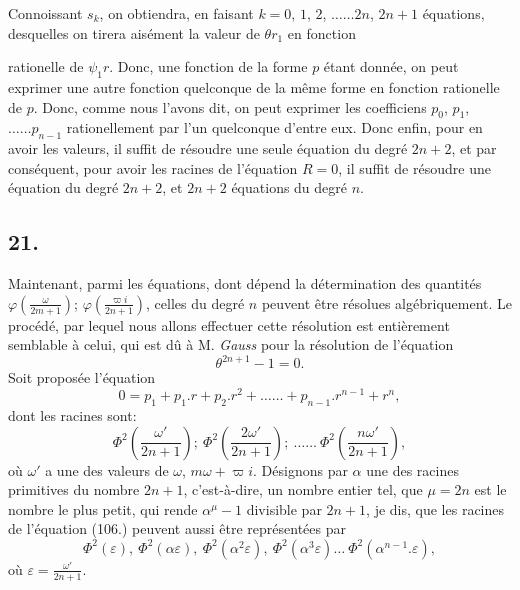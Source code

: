 \documentclass{article}
\begin{document}
Connoissant $s_{k}$, on obtiendra, en faisant $k=0$, $1$, $2$, $\ldots\ldots 2n$, $2n+1$ équations, desquelles on tirera aisément la valeur de $\theta r_{1}$ en fonction

rationelle de $\psi_{1}r$. Donc, une fonction de la forme $p$ étant donnée, on peut exprimer une autre fonction quelconque de la même forme en fonction rationelle de $p$. Donc, comme nous l'avons dit, on peut exprimer les coefficiens $p_{0}$, $p_{1}$, $\ldots\ldots p_{n-1}$ rationellement par l'un quelconque d'entre eux. Donc enfin, pour en avoir les valeurs, il suffit de résoudre une seule équation du degré $2n+2$, et par conséquent, pour avoir les racines de l'équation $R=0$, il suffit de résoudre une équation du degré $2n+2$, et $2n+2$ équations du degré $n$.

\subsection*{21.}

Maintenant, parmi les équations, dont dépend la détermination des quantités $\varphi\left(\frac{\omega}{2m+1}\right)$; $\varphi\left(\frac{\varpi i}{2n+1}\right)$, celles du degré $n$ peuvent être résolues algébriquement. Le procédé, par lequel nous allons effectuer cette résolution est entièrement semblable à celui, qui est dû à M. \emph{Gauss} pour la résolution de l'équation
\[ \theta^{2n+1}-1=0. \]
Soit proposée l'équation
\[ 0=p_{1}+p_{1}.r+p_{2}.r^{2}+\ldots\ldots+p_{n-1}.r^{n-1}+r^{n}, \tag{106.} \]
dont les racines sont:
\[ \Phi^{2}\left(\frac{\omega'}{2n+1}\right);\ \Phi^{2}\left(\frac{2\omega'}{2n+1}\right);\ \ldots\ldots\ \Phi^{2}\left(\frac{n\omega'}{2n+1}\right), \]
où $\omega'$ a une des valeurs de $\omega$, $m\omega+\varpi i$. Désignons par $\alpha$ une des racines primitives du nombre $2n+1$, c'est-à-dire, un nombre entier tel, que $\mu=2n$ est le nombre le plus petit, qui rende $\alpha^{\mu}-1$ divisible par $2n+1$, je dis, que les racines de l'équation (106.) peuvent aussi être représentées par
\[ \Phi^{2}(\varepsilon),\ \Phi^{2}(\alpha\varepsilon),\ \Phi^{2}(\alpha^{2}\varepsilon),\ \Phi^{2}(\alpha^{3}\varepsilon)\ldots\ \Phi^{2}(\alpha^{n-1}.\varepsilon), \tag{107.} \]
où $\varepsilon=\frac{\omega'}{2n+1}$.
\end{document}
